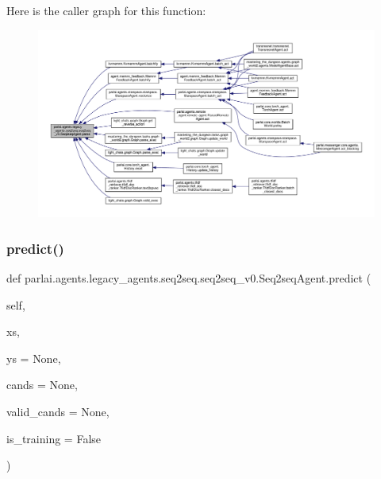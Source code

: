 Here is the caller graph for this function\+:
\nopagebreak
\begin{figure}[H]
\begin{center}
\leavevmode
\includegraphics[width=350pt]{classparlai_1_1agents_1_1legacy__agents_1_1seq2seq_1_1seq2seq__v0_1_1Seq2seqAgent_a073830870e283f88ee45a95c0ae8ad2f_icgraph}
\end{center}
\end{figure}
\mbox{\label{classparlai_1_1agents_1_1legacy__agents_1_1seq2seq_1_1seq2seq__v0_1_1Seq2seqAgent_aadec879f7d8daa6451076e4fb358715b}} 
\subsubsection{\texorpdfstring{predict()}{predict()}}
{\footnotesize\ttfamily def parlai.\+agents.\+legacy\+\_\+agents.\+seq2seq.\+seq2seq\+\_\+v0.\+Seq2seq\+Agent.\+predict (\begin{DoxyParamCaption}\item[{}]{self,  }\item[{}]{xs,  }\item[{}]{ys = {\ttfamily None},  }\item[{}]{cands = {\ttfamily None},  }\item[{}]{valid\+\_\+cands = {\ttfamily None},  }\item[{}]{is\+\_\+training = {\ttfamily False} }\end{DoxyParamCaption})}

